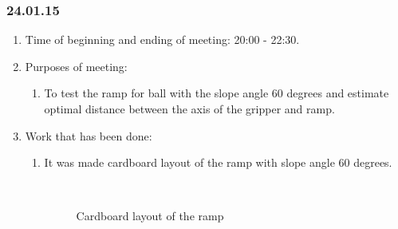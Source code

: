 \subsubsection{24.01.15}
\begin{enumerate}
	
	\item Time of beginning and ending of meeting: 20:00 - 22:30.
	
	\item Purposes of meeting:
	\begin{enumerate}
		
		\item To test the ramp for ball with the slope angle 60 degrees and estimate optimal distance between the axis of the gripper and ramp.
		
	\end{enumerate}

	\item Work that has been done:
	\begin{enumerate}
		
		\item It was made cardboard layout of the ramp with slope angle 60 degrees.
		 		         \begin{figure}[H]
		 		         	\begin{minipage}[h]{0.2\linewidth}
		 		         		\center  
		 		         	\end{minipage}
		 		         	\begin{minipage}[h]{0.6\linewidth}
		 		         		\caption{Cardboard layout of the ramp}
		 		         	\end{minipage}
		 		         \end{figure}		
		

\end{enumerate}
\end{enumerate}
